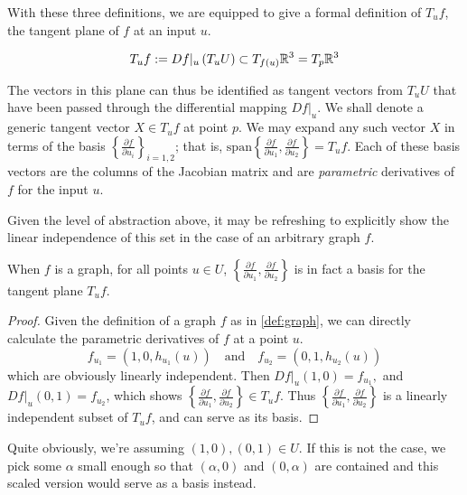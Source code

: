 With these three definitions, we are equipped to give a formal definition of $T_uf$,
the tangent plane of $f$ at an input $u$.
\begin{defn}\label{def:tangent-plane}
\[
T_u f := Df\vert_u \left(T_u U\right)
\subset T_{f(u)} \mathbb{R}^3 = T_{p} \mathbb{R}^3
\]
\end{defn}

The vectors in this plane can thus be identified as tangent vectors from $T_uU$ that have been passed through the differential mapping $Df\vert_u$.
We shall denote a generic tangent vector $X \in T_u f$ at point $p$.
We may expand any such vector $X$ in terms of the basis $\left\{ \frac{\partial f}{\partial u_i}\right\}_{i=1,2}$; that is,
$\textrm{span}\left\{ \frac{\partial f}{\partial u_1}, \frac{\partial f}{\partial u_2}\right\} = T_u f$. Each of these basis vectors are the columns of the Jacobian matrix and are \textit{parametric} derivatives of $f$ for the input $u$.  

Given the level of abstraction above, it may be refreshing to explicitly show the linear independence of this set in the case of an arbitrary graph $f$.
\begin{lemma} \label{lemma:f_ui-is-a-basis}
	When $f$ is a graph, for all points $u \in U$, $\left\{\frac{\partial f}{\partial u_1} , \frac{\partial f}{\partial u_2}\right\}$ is in fact a basis for the tangent plane $T_uf$.
\end{lemma}

\begin{proof}
Given the definition of a graph $f$ as in \cref{def:graph}, we can directly calculate the parametric derivatives of $f$ at a point $u$.
\[
f_{u_1} = (1,0,h_{u_1}(u)) \quad\textrm{and}\quad f_{u_2} = (0,1,h_{u_2}(u))
\]
 which are obviously linearly independent.  Then $Df\vert_u (1,0) = f_{u_1} ,$ and $ Df\vert_u (0,1) = f_{u_2}$, which shows $\left\{\frac{\partial f}{\partial u_1} , \frac{\partial f}{\partial u_2}\right\} \in T_uf$.  Thus $\left\{\frac{\partial f}{\partial u_1} , \frac{\partial f}{\partial u_2}\right\}$ is a linearly independent subset of $T_u f$, and can serve as its basis.\end{proof}

Quite obviously, we're assuming $(1,0), (0,1) \in U$. If this is not the case, we pick some $\alpha$ small enough so that $(\alpha,0)$ and $(0,\alpha)$ are contained and this scaled version would serve as a basis instead.

